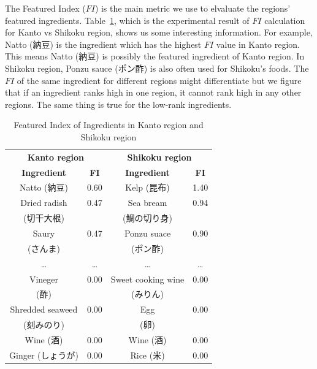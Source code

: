 \documentclass{sig-alternate}
\begin{document}
\begin{CJK}{UTF8}{min}

The Featured Index ($FI$) is the main metric we use to elvaluate the regions' featured ingredients. Table~\ref{tab:FI}, which is the experimental result of $FI$ calculation for Kanto vs Shikoku region, shows us some interesting information. For example, Natto (納豆) is the ingredient which has the highest $FI$ value in Kanto region. This means Natto (納豆) is possibly the featured ingredient of Kanto region. In Shikoku region, Ponzu sauce (ポン酢) is also often used for Shikoku's foods. The $FI$ of the same ingredient for different regions might differentiate but we figure that if an ingredient ranks high in one region, it cannot rank high in any other regions. The same thing is true for the low-rank ingredients.	  

\begin{table}
\centering
\caption{Featured Index of Ingredients in Kanto region and Shikoku region}
\begin{tabular}{|c|c|c|c|}
\hline
\multicolumn{2}{|c|}{\textbf{\large Kanto region}} & \multicolumn{2}{|c|}{\textbf{\large Shikoku region}} \\
\cline{1-4}

\textbf{Ingredient} &	\textbf{ FI} & \textbf{Ingredient} & \textbf{FI}\\ \hline
Natto (納豆)		&0.60 	& Kelp (昆布)		&	1.40\\ \hline
Dried radish 	&0.47 	& Sea bream 	&	0.94\\ 
 (切干大根) & & (鯛の切り身)  & \\ \hline
Saury 	&0.47 	&  Ponzu suace 	& 	0.90\\
(さんま) & & (ポン酢) & \\ \hline
\ldots 		&\ldots 	& \ldots 			& 	\ldots \\ \hline
Vineger		& 0.00 	& Sweet cooking wine 	&	0.00  \\
 (酢)	& & (みりん) & \\ \hline
Shredded seaweed 	&0.00	& Egg 				&	0.00 \\ 
(刻みのり) & & (卵) & \\ \hline
Wine (酒)			&0.00	& Wine (酒)					&	0.00 \\ \hline
Ginger (しょうが) 		&0.00	& Rice (米)					&	0.00 \\ \hline
\end{tabular}

\label{tab:FI}
\end{table} 

\end{CJK}
  
\end{document}
